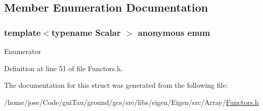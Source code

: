 \subsection{Member Enumeration Documentation}
\hypertarget{structei__functor__traits_3_01ei__scalar__add__op_3_01_scalar_01_4_01_4_a6e1bbefe336a3a97438f82b46bbf5685}{\subsubsection[{anonymous enum}]{\setlength{\rightskip}{0pt plus 5cm}template$<$typename Scalar $>$ anonymous enum}}\label{structei__functor__traits_3_01ei__scalar__add__op_3_01_scalar_01_4_01_4_a6e1bbefe336a3a97438f82b46bbf5685}
\begin{Desc}
\item[Enumerator]\par
\begin{description}
\item[{\em 
\hypertarget{structei__functor__traits_3_01ei__scalar__add__op_3_01_scalar_01_4_01_4_a6e1bbefe336a3a97438f82b46bbf5685a168936a8b6074e1d0a62903fe4eb540b}{Cost}\label{structei__functor__traits_3_01ei__scalar__add__op_3_01_scalar_01_4_01_4_a6e1bbefe336a3a97438f82b46bbf5685a168936a8b6074e1d0a62903fe4eb540b}
}]\end{description}
\end{Desc}


Definition at line 51 of file Functors.\-h.



The documentation for this struct was generated from the following file\-:\begin{DoxyCompactItemize}
\item 
/home/jose/\-Code/gui\-Tau/ground/gcs/src/libs/eigen/\-Eigen/src/\-Array/\hyperlink{_array_2_functors_8h}{Functors.\-h}\end{DoxyCompactItemize}
